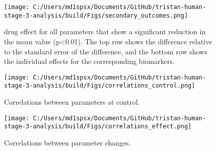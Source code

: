 \documentclass{epflreport}%
\begin{document}
%
\clearpage%


\begin{figure}[h!]%
\centering%
\texttt{[image: C:/Users/md1spsx/Documents/GitHub/tristan-human-stage-3-analysis/build/Figs/secondary\_outcomes.png]}%
\caption{drug effect for all parameters that show a significant reduction in the mean value (p<0.01). The top row shows the difference relative to the standard error of the difference, and the bottom row shows the individual effects for the corresponding biomarkers.}%
\end{figure}

%
\clearpage%


\begin{figure}[h!]%
\centering%
\texttt{[image: C:/Users/md1spsx/Documents/GitHub/tristan-human-stage-3-analysis/build/Figs/correlations\_control.png]}%
\caption{Correlations between parameters at control.}%
\end{figure}

%
\clearpage%


\begin{figure}[h!]%
\centering%
\texttt{[image: C:/Users/md1spsx/Documents/GitHub/tristan-human-stage-3-analysis/build/Figs/correlations\_effect.png]}%
\caption{Correlations between parameter changes.}%
\end{figure}

%
\clearpage%
\end{document}
